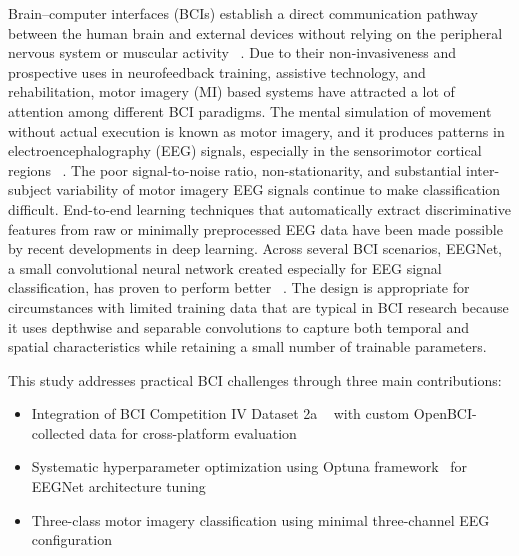 Brain–computer interfaces (BCIs) establish a direct communication pathway between the human brain and external devices without relying on the peripheral nervous system or muscular activity ~\cite{zhang2017hybrid,jeong2020brain,zhang2019strength}. Due to their non-invasiveness and prospective uses in neurofeedback training, assistive technology, and rehabilitation, motor imagery (MI) based systems have attracted a lot of attention among different BCI paradigms.  The mental simulation of movement without actual execution is known as motor imagery, and it produces patterns in electroencephalography (EEG) signals, especially in the sensorimotor cortical regions ~\cite{Motor2023}.
The poor signal-to-noise ratio, non-stationarity, and substantial inter-subject variability of motor imagery EEG signals continue to make classification difficult.  End-to-end learning techniques that automatically extract discriminative features from raw or minimally preprocessed EEG data have been made possible by recent developments in deep learning.
Across several BCI scenarios, EEGNet, a small convolutional neural network created especially for EEG signal classification, has proven to perform better ~\cite{lawhern2018eegnet}.  The design is appropriate for circumstances with limited training data that are typical in BCI research because it uses depthwise and separable convolutions to capture both temporal and spatial characteristics while retaining a small number of trainable parameters.

This study addresses practical BCI challenges through three main contributions:
\begin{itemize}
  \item Integration of BCI Competition IV Dataset 2a ~\cite{brunner2008graz} with custom OpenBCI-collected data for cross-platform evaluation
  \item Systematic hyperparameter optimization using Optuna framework~\cite{akiba2019optuna} for EEGNet architecture tuning
  \item Three-class motor imagery classification using minimal three-channel EEG configuration
\end{itemize}

